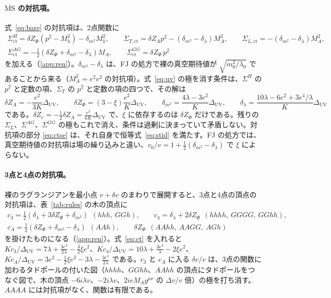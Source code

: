 \documentclass[a4paper,10pt]{ltjsarticle}
\newcommand{\MSbar}{\overline{\mathrm{MS}}}
\newcommand{\DUV}{\Delta_{\mathrm{UV}}}
\begin{document}
\paragraph{$\MSbar$ の対抗項。}式~\eqref{eq:bare} の対抗項は、2点関数に
\begin{equation}
\begin{gathered}
\Sigma^H_{\mathrm{ct}}=\delta Z_\Phi(p^2-M_h^2)-\delta_{m^2}M_h^2,\qquad
\Sigma_{T,\mathrm{ct}}=\delta Z_Ap^2-(\delta_{m^2}-\delta_\lambda)M_A^2,\qquad
\Sigma_{L,\mathrm{ct}}=-(\delta_{m^2}-\delta_\lambda)M_A^2,\\
\Sigma^{AG}_{\mathrm{ct}}=-\frac12(\delta Z_\Phi+\delta_{m^2}-\delta_\lambda)M_A,\qquad
\Sigma^{GG}_{\mathrm{ct}}=\delta Z_\Phi\,p^2
\end{gathered}
\label{eq:ctse}
\end{equation}
を加える（\ref{app:ren}）。$\delta_{m^2}-\delta_\lambda$ は、FJ の処方で裸の真空期待値が $\sqrt{m_0^2/\lambda_0}$ であることから来る（$M_A^2=e^2v^2$ の対抗項）。式~\eqref{eq:uv} の極を消す条件は、$\Sigma^H$ の $p^2$ と定数の項、$\Sigma_T$ の $p^2$ と定数の項の四つで、その解は
\begin{equation}
\delta Z_A=-\frac{e^2}{3K}\DUV,\qquad
\delta Z_\Phi=(3-\xi)\frac{e^2}K\DUV,\qquad
\delta_{m^2}=\frac{4\lambda-3e^2}K\DUV,\qquad
\delta_\lambda=\frac{10\lambda-6e^2+3e^4/\lambda}K\DUV
\label{eq:ct}
\end{equation}
である。$\delta Z_e=-\frac12\delta Z_A=\frac{e^2}{6K}\DUV$ で、$\xi$ に依存するのは $\delta Z_\Phi$ だけである。残りの $\Sigma_L$、$\Sigma^{AG}$、$\Sigma^{GG}$ の極もこれで消え、条件は過剰に決まっていて矛盾しない。対抗項の部分 \eqref{eq:ctse} は、それ自身で恒等式~\eqref{eq:stid} を満たす。FJ の処方では、真空期待値の対抗項は場の繰り込みと違い、$v_0/v=1+\frac12(\delta_{m^2}-\delta_\lambda)$ で $\xi$ によらない。

\paragraph{3点と4点の対抗項。}裸のラグランジアンを最小点 $v+\delta v$ のまわりで展開すると、3点と4点の頂点の対抗項は、表~\ref{tab:rules} の木の頂点に
\begin{equation}
\begin{gathered}
c_3=\tfrac12(\delta_\lambda+3\delta Z_\Phi+\delta_{m^2})\ \ (hhh,\ GGh),\qquad
c_4=\delta_\lambda+2\delta Z_\Phi\ \ (hhhh,\ GGGG,\ GGhh),\\
c_A=\tfrac12(\delta Z_\Phi+\delta_{m^2}-\delta_\lambda)\ \ (AAh),\qquad
\delta Z_\Phi\ \ (AAhh,\ AAGG,\ AGh)
\end{gathered}
\label{eq:ctv}
\end{equation}
を掛けたものになる（\ref{app:ren}）。式~\eqref{eq:ct} を入れると $Kc_3/\DUV=7\lambda+\frac{3e^4}{2\lambda}-\frac32\xi e^2$、$Kc_4/\DUV=10\lambda+\frac{3e^4}\lambda-2\xi e^2$、$Kc_A/\DUV=3e^2-\frac12\xi e^2-3\lambda-\frac{3e^4}{2\lambda}$ である。$c_3$ と $c_A$ に入る $\delta v/v$ は、3点の関数に加わるタドポールの付いた図（$hhhh$、$GGhh$、$AAhh$ の頂点にタドポールをつなぐ図で、木の頂点 $-6i\lambda v$、$-2i\lambda v$、$2ieM_Ag^{\mu\nu}$ の $\Delta v/v$ 倍）の極を打ち消す。$AAAA$ には対抗項がなく、関数は有限である。
\end{document}
